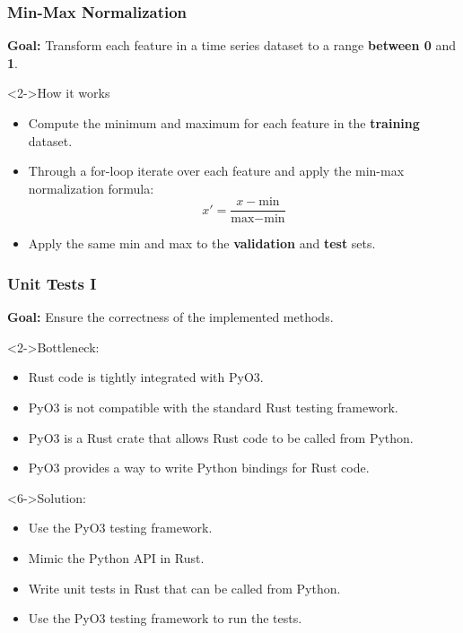 \documentclass[t,english]{beamer}
\begin{document}
\begin{frame}
  \frametitle{Min-Max Normalization}
  \textbf{Goal:} Transform each feature in a time series dataset to a range \textbf{between 0} and \textbf{1}.

  \begin{block}<2->{How it works}
    \begin{itemize}
      \item<2-> Compute the minimum and maximum for each feature in the \textbf{training} dataset.
      \item<3-> Through a for-loop iterate over each feature and apply the min-max normalization formula:
            \begin{equation}
              x' = \frac{x - \text{min}}{\text{max} - \text{min}}
            \end{equation}
      \item<4-> Apply the same min and max to the \textbf{validation} and \textbf{test} sets.
    \end{itemize}
  \end{block}
\end{frame}

\begin{frame}
  \frametitle{Unit Tests I}
  \textbf{Goal:} Ensure the correctness of the implemented methods.
  
    \begin{block}<2->{Bottleneck:}
        \begin{itemize}
        \item <2-> Rust code is tightly integrated with PyO3.
        \item <3-> PyO3 is not compatible with the standard Rust testing framework.
        \item <4-> PyO3 is a Rust crate that allows Rust code to be called from Python.
        \item <5-> PyO3 provides a way to write Python bindings for Rust code.
        \end{itemize}
    \end{block}

    \begin{block}<6->{Solution:}
        \begin{itemize}
        \item <6-> Use the PyO3 testing framework.
        \item <7-> Mimic the Python API in Rust.
        \item <8-> Write unit tests in Rust that can be called from Python.
        \item <9-> Use the PyO3 testing framework to run the tests.
        \end{itemize}
    \end{block}

\end{frame}
\end{document}
